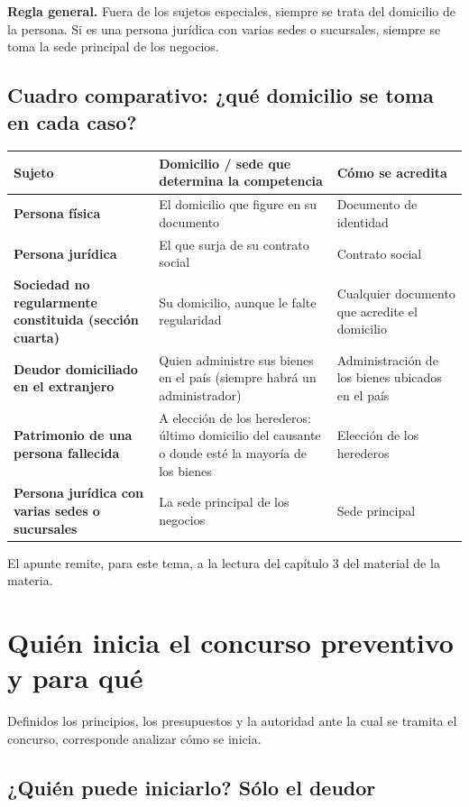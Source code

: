 \documentclass[12pt,oneside]{book}
\begin{document}
\textbf{Regla general.} Fuera de los sujetos especiales, siempre se trata del domicilio de la persona. Si es una persona jurídica con varias sedes o sucursales, siempre se toma la sede principal de los negocios.

\subsection{Cuadro comparativo: ¿qué domicilio se toma en cada caso?}

\begingroup
\small
\renewcommand{\arraystretch}{1.25}
\begin{tabularx}{\textwidth}{>{\raggedright\arraybackslash}p{} Y Y}
\toprule
\textbf{Sujeto} & \textbf{Domicilio / sede que determina la competencia} & \textbf{Cómo se acredita} \\
\midrule
\textbf{Persona física} & El domicilio que figure en su documento & Documento de identidad \\
\textbf{Persona jurídica} & El que surja de su contrato social & Contrato social \\
\textbf{Sociedad no regularmente constituida (sección cuarta)} & Su domicilio, aunque le falte regularidad & Cualquier documento que acredite el domicilio \\
\textbf{Deudor domiciliado en el extranjero} & Quien administre sus bienes en el país (siempre habrá un administrador) & Administración de los bienes ubicados en el país \\
\textbf{Patrimonio de una persona fallecida} & A elección de los herederos: último domicilio del causante o donde esté la mayoría de los bienes & Elección de los herederos \\
\textbf{Persona jurídica con varias sedes o sucursales} & La sede principal de los negocios & Sede principal \\
\bottomrule
\end{tabularx}
\endgroup

\medskip
El apunte remite, para este tema, a la lectura del capítulo 3 del material de la materia.

\section{Quién inicia el concurso preventivo y para qué}

Definidos los principios, los presupuestos y la autoridad ante la cual se tramita el concurso, corresponde analizar cómo se inicia.

\subsection{¿Quién puede iniciarlo? Sólo el deudor}
\end{document}
